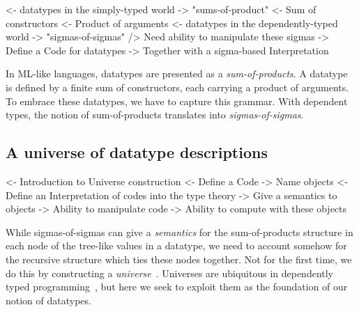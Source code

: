 \begin{wstructure}
<- datatypes in the simply-typed world
    -> "sums-of-product"
        <- Sum of constructors
        <- Product of arguments
<- datatypes in the dependently-typed world
    -> "sigmas-of-sigmas"
    /> Need ability to manipulate these sigmas
        -> Define a Code for datatypes
        -> Together with a sigma-based Interpretation
\end{wstructure}

In ML-like languages, datatypes are presented as a
\emph{sum-of-products}. A datatype is defined by a finite sum of
constructors, each carrying a product of arguments. To embrace
these datatypes, we have to capture this grammar.
With dependent types, the notion of sum-of-products translates into
\emph{sigmas-of-sigmas}.


\subsection{A universe of datatype descriptions}
\label{sec:desc-universe}

\begin{wstructure}
<- Introduction to Universe construction
    <- Define a Code
        -> Name objects
    <- Define an Interpretation of codes into the type theory
        -> Give a semantics to objects
    -> Ability to manipulate code
    -> Ability to compute with these objects
\end{wstructure}

While sigmas-of-sigmas can give a \emph{semantics} for the
sum-of-products structure in each node of the tree-like values in a
datatype, we need to account somehow for the recursive structure which
ties these nodes together. Not for the first time, we do this by
constructing a \emph{universe}~\cite{martin-lof:itt}. Universes
are ubiquitous in dependently typed
programming~\cite{benke:universe-generic-prog, oury:power-of-pi},
but here we seek to exploit them as the foundation of our notion
of datatypes.


